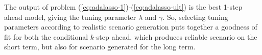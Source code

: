 The output of problem (\ref{eq:adalasso-1})-(\ref{eq:adalasso-ult}) is the best 1-step ahead model, giving the tuning parameter $\lambda$ and $\gamma$. 
So, selecting tuning parameters according to realistic scenario generation puts together a goodness of fit for both the conditional $k$-step ahead, which produces reliable scenario on the short term, but also for scenario generated for the long term.  








